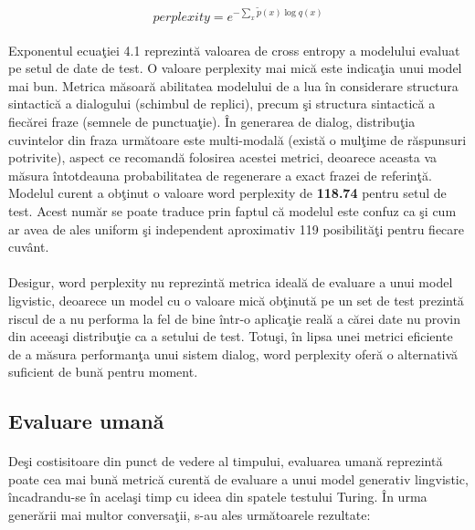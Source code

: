 \begin{equation}
perplexity = e^{-\sum_{x}\tilde{p}(x)\log{q(x)}}
\end{equation}

\paragraph{}
Exponentul ecua\c tiei 4.1 reprezint\u a valoarea de cross entropy a modelului evaluat pe setul de date de test. O valoare perplexity mai mic\u a este indica\c tia unui model mai bun. Metrica m\u asoar\u a abilitatea modelului de a lua \^ in considerare structura sintactic\u a a dialogului (schimbul de replici), precum \c si structura sintactic\u a a fiec\u arei fraze (semnele de punctua\c tie). \^ In generarea de dialog, distribu\c tia cuvintelor din fraza urm\u atoare este multi-modal\u a (exist\u a o mul\c time de r\u aspunsuri potrivite), aspect ce recomand\u a folosirea acestei metrici, deoarece aceasta va m\u asura \^ intotdeauna probabilitatea de regenerare a exact frazei de referin\c t\u a. Modelul curent a ob\c tinut o valoare word perplexity de \textbf{118.74} pentru setul de test. Acest num\u ar se poate traduce prin faptul c\u a modelul este confuz ca \c si cum ar avea de ales uniform \c si independent aproximativ 119 posibilit\u a\c ti pentru fiecare cuv\^ ant.

\paragraph{}
Desigur, word perplexity nu reprezint\u a metrica ideal\u a de evaluare a unui model ligvistic, deoarece un model cu o valoare mic\u a ob\c tinut\u a pe un set de test prezint\u a riscul de a nu performa la fel de bine \^ intr-o aplica\c tie real\u a a c\u arei date nu provin din aceea\c si distribu\c tie ca a setului de test. Totu\c si, \^ in lipsa unei metrici eficiente de a m\u asura performan\c ta unui sistem dialog, word perplexity ofer\u a o alternativ\u a suficient de bun\u a pentru moment.

\subsection{Evaluare uman\u a}

\paragraph{}
De\c si costisitoare din punct de vedere al timpului, evaluarea uman\u a reprezint\u a poate cea mai bun\u a metric\u a curent\u a de evaluare a unui model generativ lingvistic, \^ incadrandu-se \^ in acela\c si timp cu ideea din spatele testului Turing. \^ In urma gener\u arii mai multor conversa\c tii, s-au ales urm\u atoarele rezultate:

